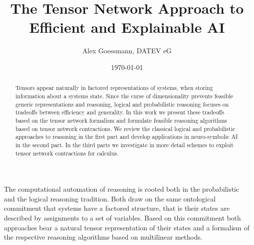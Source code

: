 \documentclass[aps,onecolumn,nofootinbib,pra]{article}
\begin{document}
\title{The Tensor Network Approach to Efficient and Explainable AI}
\author{Alex Goessmann, DATEV eG}

\maketitle
\date{\today}

\begin{abstract}
	Tensors appear naturally in factored representations of systems, when storing information about a systems state.
	Since the curse of dimensionality prevents feasible generic representations and reasoning, logical and probabilistic reasoning focuses on tradeoffs between efficiency and generality.
	In this work we present these tradeoffs based on the tensor network formalism and formulate feasible reasoning algorithms based on tensor network contractions.
	We review the classical logical and probabilistic approaches to reasoning in the first part and develop applications in neuro-symbolic AI in the second part.
	In the third parts we investigate in more detail schemes to exploit tensor network contractions for calculus.
\end{abstract}	

\tableofcontents




\part{\partonetext}\label{par:one}

The computational automation of reasoning is rooted both in the probabilistic and the logical reasoning tradition.
Both draw on the same ontological commitment that systems have a factored structure, that is their states are described by assignments to a set of variables.
Based on this commitment both approaches bear a natural tensor representation of their states and a formalism of the respective reasoning algorithms based on multilinear methods.







\end{document}
